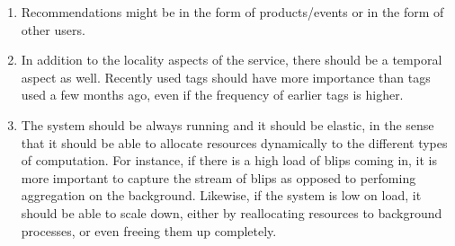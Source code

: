 \documentclass[12pt,a4paper]{article}
\begin{document}
\begin{enumerate}
\item Recommendations might be in the form of products/events or in the form of other users.
\item In addition to the locality aspects of the service, there should be a temporal aspect as well. Recently used tags should have more importance than tags used a few months ago, even if the frequency of earlier tags is higher.
\item The system should be always running and it should be elastic, in the sense that it should be able to allocate resources dynamically to the different types of computation. For instance, if there is a high load of blips coming in, it is more important to capture the stream of blips as opposed to perfoming aggregation on the background. Likewise, if the system is low on load, it should be able to scale down, either by reallocating resources to background processes, or even freeing them up completely. 
\end{enumerate}
\end{document}
